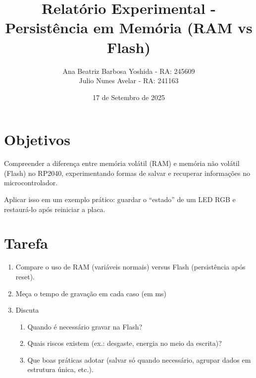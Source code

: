 \documentclass{article}
\title{Relatório Experimental - Persistência em Memória (RAM vs Flash)}
\author{Ana Beatriz Barbosa Yoshida - RA: 245609 \\ Julio Nunes Avelar - RA: 241163}
\date{17 de Setembro de 2025}
\begin{document}
\maketitle

\section{Objetivos}

Compreender a diferença entre memória volátil (RAM) e memória não volátil (Flash) no RP2040, experimentando formas de salvar e recuperar informações no microcontrolador.

Aplicar isso em um exemplo prático: guardar o “estado” de um LED RGB e restaurá-lo após reiniciar a placa.

\section{Tarefa}

\begin{enumerate}
    \item Compare o uso de RAM (variáveis normais) versus Flash (persistência após reset).
    \item Meça o tempo de gravação em cada caso (em ms)
    \item Discuta
    \begin{enumerate}
        \item Quando é necessário gravar na Flash?
        \item Quais riscos existem (ex.: desgaste, energia no meio da escrita)?
        \item Que boas práticas adotar (salvar só quando necessário, agrupar dados em estrutura única, etc.).
    \end{enumerate}
\end{enumerate}
\end{document}
